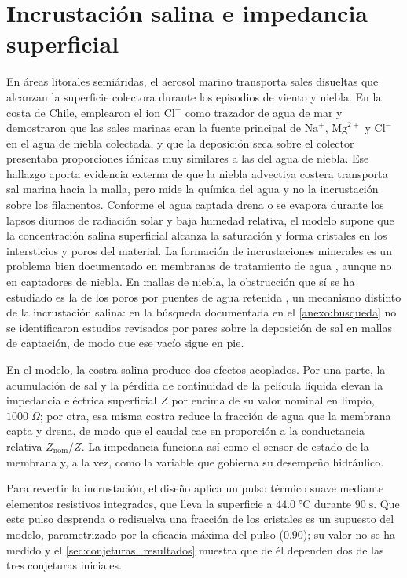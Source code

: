 \section{Incrustaci\'on salina e impedancia superficial}
En \'areas litorales semi\'aridas, el aerosol marino transporta sales disueltas que alcanzan la superficie colectora durante los episodios de viento y niebla. En la costa de Chile, \textcite{schemenauer1992quality} emplearon el ion $\text{Cl}^-$ como trazador de agua de mar y demostraron que las sales marinas eran la fuente principal de $\text{Na}^+$, $\text{Mg}^{2+}$ y $\text{Cl}^-$ en el agua de niebla colectada, y que la deposici\'on seca sobre el colector presentaba proporciones i\'onicas muy similares a las del agua de niebla. Ese hallazgo aporta evidencia externa de que la niebla advectiva costera transporta sal marina hacia la malla, pero mide la qu\'imica del agua y no la incrustaci\'on sobre los filamentos. Conforme el agua captada drena o se evapora durante los lapsos diurnos de radiaci\'on solar y baja humedad relativa, el modelo supone que la concentraci\'on salina superficial alcanza la saturaci\'on y forma cristales en los intersticios y poros del material. La formaci\'on de incrustaciones minerales es un problema bien documentado en membranas de tratamiento de agua \parencite{antony2011scale}, aunque no en captadores de niebla. En mallas de niebla, la obstrucci\'on que s\'i se ha estudiado es la de los poros por puentes de agua retenida \parencite{park2021clogged}, un mecanismo distinto de la incrustaci\'on salina: en la b\'usqueda documentada en el \cref{anexo:busqueda} no se identificaron estudios revisados por pares sobre la deposici\'on de sal en mallas de captaci\'on, de modo que ese vac\'io sigue en pie.

En el modelo, la costra salina produce dos efectos acoplados. Por una parte, la acumulaci\'on de sal y la p\'erdida de continuidad de la pel\'icula l\'iquida elevan la impedancia el\'ectrica superficial $Z$ por encima de su valor nominal en limpio, $1000\;\Omega$; por otra, esa misma costra reduce la fracci\'on de agua que la membrana capta y drena, de modo que el caudal cae en proporci\'on a la conductancia relativa $Z_{\text{nom}}/Z$. La impedancia funciona as\'i como el sensor de estado de la membrana y, a la vez, como la variable que gobierna su desempe\~no hidr\'aulico.

Para revertir la incrustaci\'on, el dise\~no aplica un pulso t\'ermico suave mediante elementos resistivos integrados, que lleva la superficie a $44.0\;\si{\celsius}$ durante $90\;\text{s}$. Que este pulso desprenda o redisuelva una fracci\'on de los cristales es un supuesto del modelo, parametrizado por la eficacia m\'axima del pulso ($0.90$); su valor no se ha medido y el \cref{sec:conjeturas_resultados} muestra que de \'el dependen dos de las tres conjeturas iniciales.

